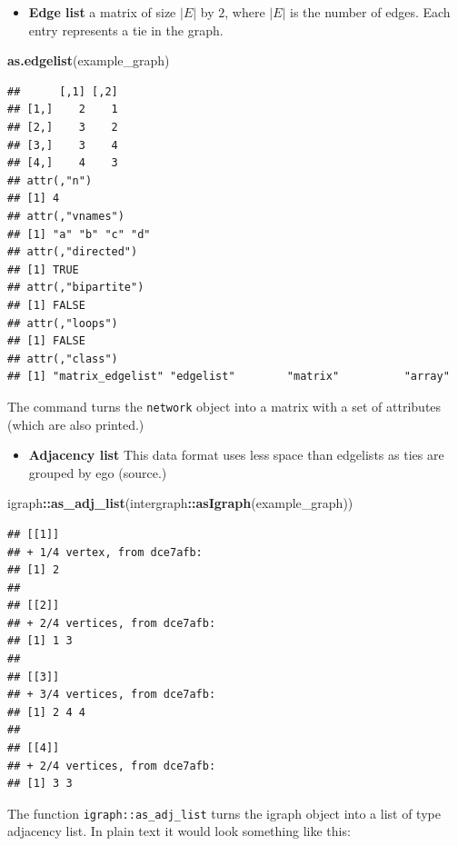 \documentclass[]{book}
\newenvironment{Shaded}{\begin{snugshade}}{\end{snugshade}}
\newcommand{\KeywordTok}[1]{\textcolor[rgb]{0.13,0.29,0.53}{\textbf{#1}}}
\newcommand{\NormalTok}[1]{#1}
\newcommand{\OperatorTok}[1]{\textcolor[rgb]{0.81,0.36,0.00}{\textbf{#1}}}
\providecommand{\tightlist}{%
  \setlength{\itemsep}{0pt}\setlength{\parskip}{0pt}}
\begin{document}
\begin{itemize}
\tightlist
\item
  \textbf{Edge list} a matrix of size \(|E|\) by \(2\), where \(|E|\) is the number of edges.
  Each entry represents a tie in the graph.
\end{itemize}

\begin{Shaded}
\begin{Highlighting}[]
\KeywordTok{as.edgelist}\NormalTok{(example_graph)}
\end{Highlighting}
\end{Shaded}

\begin{verbatim}
##      [,1] [,2]
## [1,]    2    1
## [2,]    3    2
## [3,]    3    4
## [4,]    4    3
## attr(,"n")
## [1] 4
## attr(,"vnames")
## [1] "a" "b" "c" "d"
## attr(,"directed")
## [1] TRUE
## attr(,"bipartite")
## [1] FALSE
## attr(,"loops")
## [1] FALSE
## attr(,"class")
## [1] "matrix_edgelist" "edgelist"        "matrix"          "array"
\end{verbatim}

The command turns the \texttt{network} object into a matrix with a set of attributes
(which are also printed.)

\begin{itemize}
\tightlist
\item
  \textbf{Adjacency list} This data format uses less space than edgelists as ties are
  grouped by ego (source.)
\end{itemize}

\begin{Shaded}
\begin{Highlighting}[]
\NormalTok{igraph}\OperatorTok{::}\KeywordTok{as_adj_list}\NormalTok{(intergraph}\OperatorTok{::}\KeywordTok{asIgraph}\NormalTok{(example_graph)) }
\end{Highlighting}
\end{Shaded}

\begin{verbatim}
## [[1]]
## + 1/4 vertex, from dce7afb:
## [1] 2
## 
## [[2]]
## + 2/4 vertices, from dce7afb:
## [1] 1 3
## 
## [[3]]
## + 3/4 vertices, from dce7afb:
## [1] 2 4 4
## 
## [[4]]
## + 2/4 vertices, from dce7afb:
## [1] 3 3
\end{verbatim}

The function \texttt{igraph::as\_adj\_list} turns the igraph object into a list of
type adjacency list. In plain text it would look something like this:
\end{document}
